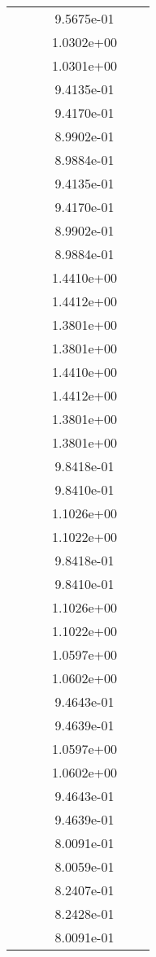 \begin{xltabular}{\textwidth}{r|rS[table-format=1.3e+2]S[table-format=1.4e+2]S[table-format=1.4e+2]S[table-format=-1.5]}
&  &  & 9.5675e-01 & & \\
&  &  & 1.0302e+00 & & \\
&  &  & 1.0301e+00 & & \\
&  &  & 9.4135e-01 & & \\
&  &  & 9.4170e-01 & & \\
&  &  & 8.9902e-01 & & \\
&  &  & 8.9884e-01 & & \\
&  &  & 9.4135e-01 & & \\
&  &  & 9.4170e-01 & & \\
&  &  & 8.9902e-01 & & \\
&  &  & 8.9884e-01 & & \\
&  &  & 1.4410e+00 & & \\
&  &  & 1.4412e+00 & & \\
&  &  & 1.3801e+00 & & \\
&  &  & 1.3801e+00 & & \\
&  &  & 1.4410e+00 & & \\
&  &  & 1.4412e+00 & & \\
&  &  & 1.3801e+00 & & \\
&  &  & 1.3801e+00 & & \\
&  &  & 9.8418e-01 & & \\
&  &  & 9.8410e-01 & & \\
&  &  & 1.1026e+00 & & \\
&  &  & 1.1022e+00 & & \\
&  &  & 9.8418e-01 & & \\
&  &  & 9.8410e-01 & & \\
&  &  & 1.1026e+00 & & \\
&  &  & 1.1022e+00 & & \\
&  &  & 1.0597e+00 & & \\
&  &  & 1.0602e+00 & & \\
&  &  & 9.4643e-01 & & \\
&  &  & 9.4639e-01 & & \\
&  &  & 1.0597e+00 & & \\
&  &  & 1.0602e+00 & & \\
&  &  & 9.4643e-01 & & \\
&  &  & 9.4639e-01 & & \\
&  &  & 8.0091e-01 & & \\
&  &  & 8.0059e-01 & & \\
&  &  & 8.2407e-01 & & \\
&  &  & 8.2428e-01 & & \\
&  &  & 8.0091e-01 & & \\

\end{xltabular}
